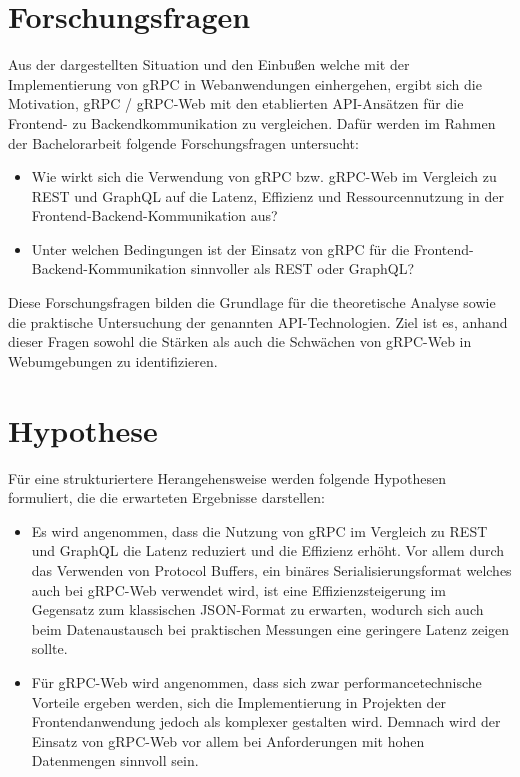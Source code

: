 \section{Forschungsfragen}
Aus der dargestellten Situation und den Einbußen welche mit der Implementierung von
gRPC in Webanwendungen einhergehen, ergibt sich die Motivation, gRPC /
gRPC-Web mit den etablierten API-Ansätzen für die Frontend- zu Backendkommunikation zu vergleichen. Dafür werden im Rahmen der Bachelorarbeit folgende Forschungsfragen untersucht:

\begin{itemize}
	\item Wie wirkt sich die Verwendung von gRPC bzw. gRPC-Web im Vergleich zu REST
	und GraphQL auf die Latenz, Effizienz und Ressourcennutzung in der Frontend-Backend-Kommunikation aus?
	
	\item Unter welchen Bedingungen ist der Einsatz von gRPC für die
	Frontend-Backend-Kommunikation sinnvoller als REST oder GraphQL?
	
\end{itemize}

Diese Forschungsfragen bilden die Grundlage für die theoretische Analyse sowie die
praktische Untersuchung der genannten API-Technologien. Ziel ist es, anhand dieser
Fragen sowohl die Stärken als auch die Schwächen von gRPC-Web in Webumgebungen
zu identifizieren.


\section{Hypothese}
Für eine strukturiertere Herangehensweise werden folgende Hypothesen formuliert, die
die erwarteten Ergebnisse darstellen:

\begin{itemize}
	\item Es wird angenommen, dass die Nutzung von gRPC im Vergleich zu REST und
	GraphQL die Latenz reduziert und die Effizienz erhöht. Vor allem durch das Verwenden
	von Protocol Buffers, ein binäres Serialisierungsformat welches auch
	bei gRPC-Web verwendet wird, ist eine Effizienzsteigerung im Gegensatz zum klassischen JSON-Format zu erwarten, wodurch sich auch beim Datenaustausch bei praktischen Messungen eine geringere Latenz zeigen sollte.
	
	\item Für gRPC-Web wird angenommen, dass sich zwar performancetechnische Vorteile
	ergeben werden, sich die Implementierung in Projekten der Frontendanwendung
	jedoch als komplexer gestalten wird. Demnach wird der Einsatz von gRPC-Web vor allem bei Anforderungen mit hohen Datenmengen sinnvoll sein.

	
\end{itemize}

